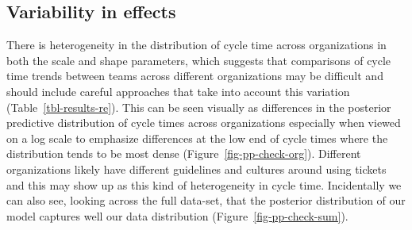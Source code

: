 \documentclass[
]{article}
\providecommand{\ascline}[3]{\noalign{\global\arrayrulewidth #1}\arrayrulecolor[HTML]{#2}\cmidrule(l){#3}}
\begin{document}
\subsection{Variability in effects}\label{variability-in-effects}

There is heterogeneity in the distribution of cycle time across
organizations in both the scale and shape parameters, which suggests
that comparisons of cycle time trends between teams across different
organizations may be difficult and should include careful approaches
that take into account this variation (Table~\ref{tbl-results-re}). This
can be seen visually as differences in the posterior predictive
distribution of cycle times across organizations especially when viewed
on a log scale to emphasize differences at the low end of cycle times
where the distribution tends to be most dense
(Figure~\ref{fig-pp-check-org}). Different organizations likely have
different guidelines and cultures around using tickets and this may show
up as this kind of heterogeneity in cycle time. Incidentally we can also
see, looking across the full data-set, that the posterior distribution
of our model captures well our data distribution
(Figure~\ref{fig-pp-check-sum}).

\providecommand{\ascline}[3]{\noalign{\global\arrayrulewidth #1}\arrayrulecolor[HTML]{#2}\cline{#3}}
\end{document}

